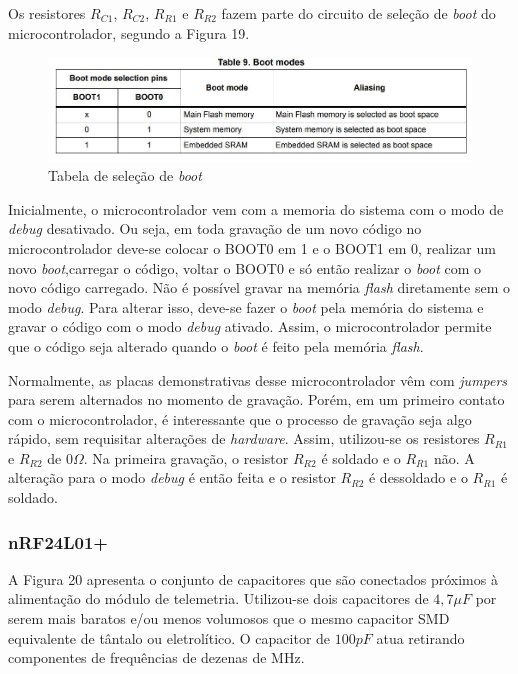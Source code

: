 \documentclass[
	12pt,				%
	openright,			%
	twoside,			%
	a4paper,			%
	english,			%
	french,				%
	spanish,			%
	brazil,				%
	]{abntex2}
\begin{document}
				Os resistores $R_{C1}$, $R_{C2}$, $R_{R1}$ e $R_{R2}$ fazem
				parte do circuito de seleção de \textit{boot} do
				microcontrolador, segundo a Figura 19.

				\begin{figure}[!ht]
					\centering
					\includegraphics[width=\linewidth]{../Fotos/bootTable.jpg}
					\caption[Tabela de seleção de \textit{boot}]{Tabela de seleção de \textit{boot}\footnotemark}
				\end{figure}

				Inicialmente, o microcontrolador vem com a memoria do
				sistema com o modo de \textit{debug} desativado. Ou seja, em
				toda gravação de um novo código no microcontrolador deve-se
				colocar o BOOT0 em 1 e o BOOT1 em 0, realizar um novo
				\textit{boot},carregar o código, voltar o BOOT0 e só então
				realizar o \textit{boot} com o novo código carregado. Não é
				possível gravar na memória \textit{flash} diretamente sem o
				modo \textit{debug}. Para alterar isso, deve-se fazer o
				\textit{boot} pela memória do sistema e gravar o código com
				o modo \textit{debug} ativado. Assim, o microcontrolador
				permite que o código seja alterado quando o \textit{boot} é
				feito pela memória \textit{flash}.

				Normalmente, as placas demonstrativas desse microcontrolador
				vêm com \textit{jumpers} para serem alternados no momento de
				gravação. Porém, em um primeiro contato com o
				microcontrolador, é interessante que o processo de gravação
				seja algo rápido, sem requisitar alterações de
				\textit{hardware}. Assim, utilizou-se os resistores $R_{R1}$
				e $R_{R2}$ de $0\Omega$. Na primeira gravação, o resistor
				$R_{R2}$ é soldado e o $R_{R1}$ não. A alteração para o modo
				\textit{debug} é então feita e o resistor $R_{R2}$ é
				dessoldado e o $R_{R1}$ é soldado.

			\subsubsection{nRF24L01+}
				A Figura 20 apresenta o conjunto de capacitores que são
				conectados próximos à alimentação do módulo de telemetria.
				Utilizou-se dois capacitores de $4,7\mu F$ por serem mais
				baratos e/ou menos volumosos que o mesmo capacitor SMD
				equivalente de tântalo ou eletrolítico. O capacitor de
				$100pF$ atua retirando componentes de frequências de dezenas
				de MHz.
\end{document}
